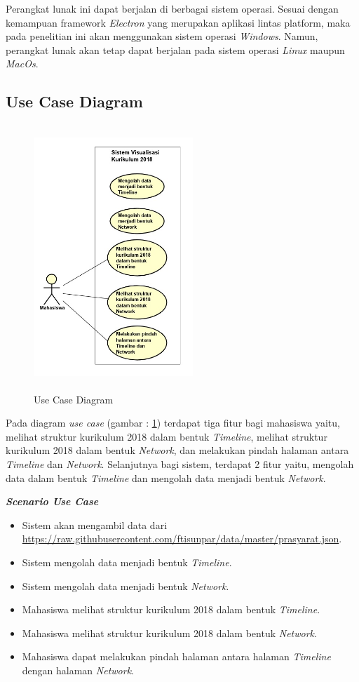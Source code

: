 Perangkat lunak ini dapat berjalan di berbagai sistem operasi. Sesuai dengan kemampuan framework \textit{Electron} yang merupakan aplikasi lintas platform, maka pada penelitian ini akan menggunakan sistem operasi \textit{Windows}. Namun, perangkat lunak akan tetap dapat berjalan pada sistem operasi \textit{Linux} maupun \textit{MacOs}.

\subsection{Use Case Diagram}
\begin{figure}[H]
    \centering
    \includegraphics[width=6cm, height=10cm]{Gambar/Use Case.jpg}
    \caption{Use Case Diagram}
    \label{fig:gambarUseCase}
\end{figure}

Pada diagram \textit{use case} (gambar : \ref{fig:gambarUseCase}) terdapat tiga fitur bagi mahasiswa yaitu, melihat struktur kurikulum 2018 dalam bentuk \textit{Timeline}, melihat struktur kurikulum 2018 dalam bentuk \textit{Network}, dan melakukan pindah halaman antara \textit{Timeline} dan \textit{Network}. Selanjutnya bagi sistem, terdapat 2 fitur yaitu, mengolah data dalam bentuk \textit{Timeline} dan mengolah data menjadi bentuk \textit{Network}. 

\textbf{\textit{Scenario Use Case}}

\begin{itemize}
    \item Sistem akan mengambil data dari \url{https://raw.githubusercontent.com/ftisunpar/data/master/prasyarat.json}.
    \item Sistem mengolah data menjadi bentuk \textit{Timeline}.
    \item Sistem mengolah data menjadi bentuk \textit{Network}.
    \item Mahasiswa melihat struktur kurikulum 2018 dalam bentuk \textit{Timeline}.
    \item Mahasiswa melihat struktur kurikulum 2018 dalam bentuk \textit{Network}.
    \item Mahasiswa dapat melakukan pindah halaman antara halaman \textit{Timeline} dengan halaman \textit{Network}.
\end{itemize}

